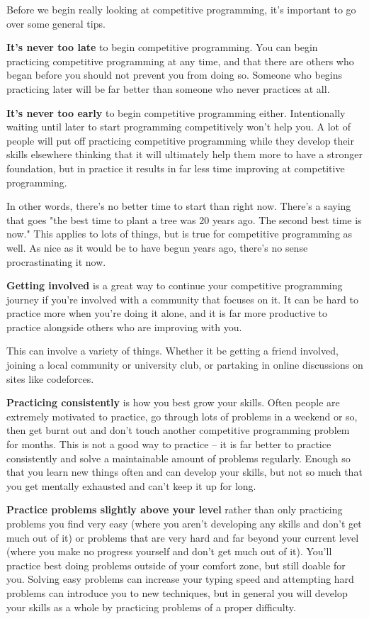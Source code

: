 Before we begin really looking at competitive programming, it's important to go over some general tips.

\textbf{It's never too late} to begin competitive programming. You can begin practicing competitive programming at any time, and that there are others who began before you should not prevent you from doing so. Someone who begins practicing later will be far better than someone who never practices at all.

\textbf{It's never too early} to begin competitive programming either. Intentionally waiting until later to start programming competitively won't help you. A lot of people will put off practicing competitive programming while they develop their skills elsewhere thinking that it will ultimately help them more to have a stronger foundation, but in practice it results in far less time improving at competitive programming.

In other words, there's no better time to start than right now. There's a saying that goes "the best time to plant a tree was 20 years ago. The second best time is now." This applies to lots of things, but is true for competitive programming as well. As nice as it would be to have begun years ago, there's no sense procrastinating it now.

\textbf{Getting involved} is a great way to continue your competitive programming journey if you're involved with a community that focuses on it. It can be hard to practice more when you're doing it alone, and it is far more productive to practice alongside others who are improving with you.

This can involve a variety of things. Whether it be getting a friend involved, joining a local community or university club, or partaking in online discussions on sites like codeforces.

\textbf{Practicing consistently} is how you best grow your skills. Often people are extremely motivated to practice, go through lots of problems in a weekend or so, then get burnt out and don't touch another competitive programming problem for months. This is not a good way to practice -- it is far better to practice consistently and solve a maintainable amount of problems regularly. Enough so that you learn new things often and can develop your skills, but not so much that you get mentally exhausted and can't keep it up for long.

\textbf{Practice problems slightly above your level} rather than only practicing problems you find very easy (where you aren't developing any skills and don't get much out of it) or problems that are very hard and far beyond your current level (where you make no progress yourself and don't get much out of it). You'll practice best doing problems outside of your comfort zone, but still doable for you. Solving easy problems can increase your typing speed and attempting hard problems can introduce you to new techniques, but in general you will develop your skills as a whole by practicing problems of a proper difficulty.

